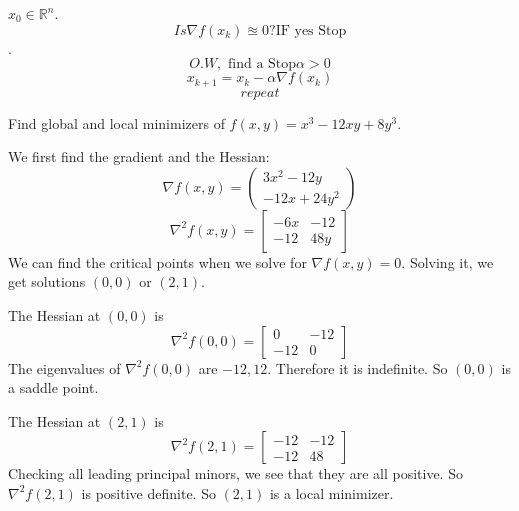 \begin{definition}
    $x_{0} \in \mathbb{R}^n$.   
    $$Is \nabla f(x_k)\approxeq 0?\text{IF yes Stop}$$.
    $$O.W, \text{ find a Stop} \alpha >0$$
    $$x_{k+1}=x_k-\alpha\nabla f(x_k)$$
    $$repeat$$
\end{definition}

\begin{problem}
    Find global and local minimizers of $f(x,y) = x^3 - 12xy + 8y^3$.
  
    \bigskip
    We first find the gradient and the Hessian:
    $$\nabla f(x,y) = \begin{pmatrix}
      3x^2 - 12y \\
      -12x + 24y^2
    \end{pmatrix}$$
    $$\nabla^2 f(x,y) = \begin{bmatrix}
      -6x & -12 \\
      -12 & 48y
    \end{bmatrix}$$
    We can find the critical points when we solve for $\nabla f(x,y) = 0$. Solving it, we get solutions $(0,0)$ or $(2,1)$.
  
    The Hessian at $(0,0)$ is $$\nabla^2 f(0,0) = \begin{bmatrix}
      0 & -12 \\
      -12 & 0
    \end{bmatrix}$$ The eigenvalues of $\nabla^2 f(0,0)$ are $-12, 12$. Therefore it is indefinite. So $(0,0)$ is a saddle point.
  
    The Hessian at $(2,1)$ is $$\nabla^2 f(2,1) = \begin{bmatrix}
      -12 & -12 \\
      -12 & 48
    \end{bmatrix}$$ Checking all leading principal minors, we see that they are all positive. So $\nabla^2 f(2,1)$ is positive definite. So $(2,1)$ is a local minimizer.
  \end{problem}

% 